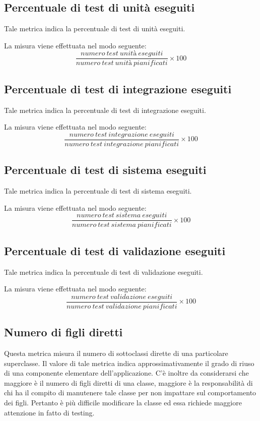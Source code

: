 \subsection{Percentuale di test di unità eseguiti}
Tale metrica indica la percentuale di test di unità eseguiti.

La misura viene effettuata nel modo seguente:
\begin{equation}
	\frac{numero~test~unità~eseguiti}{numero~test~unità~pianificati}\times100
\end{equation}

\subsection{Percentuale di test di integrazione eseguiti}
Tale metrica indica la percentuale di test di integrazione eseguiti.

La misura viene effettuata nel modo seguente:
\begin{equation}
	\frac{numero~test~integrazione~eseguiti}{numero~test~integrazione~pianificati}\times100
\end{equation}



\subsection{Percentuale di test di sistema eseguiti}
Tale metrica indica la percentuale di test di sistema eseguiti.

La misura viene effettuata nel modo seguente:
\begin{equation}
	\frac{numero~test~sistema~eseguiti}{numero~test~sistema~pianificati}\times100
\end{equation}

\subsection{Percentuale di test di validazione eseguiti}
Tale metrica indica la percentuale di test di validazione eseguiti.

La misura viene effettuata nel modo seguente:
\begin{equation}
	\frac{numero~test~validazione~eseguiti}{numero~test~validazione~pianificati}\times100
\end{equation}

\subsection{Numero di figli diretti}
Questa metrica misura il numero di sottoclassi dirette di una particolare superclasse. Il valore di tale metrica indica approssimativamente il grado di riuso di una componente elementare dell'applicazione. C'è inoltre da considerarsi che maggiore è il numero di figli diretti di una classe, maggiore è la responsabilità di chi ha il compito di manutenere tale classe per non impattare sul comportamento dei figli. Pertanto è più difficile modificare la classe ed essa richiede maggiore attenzione in fatto di testing.

